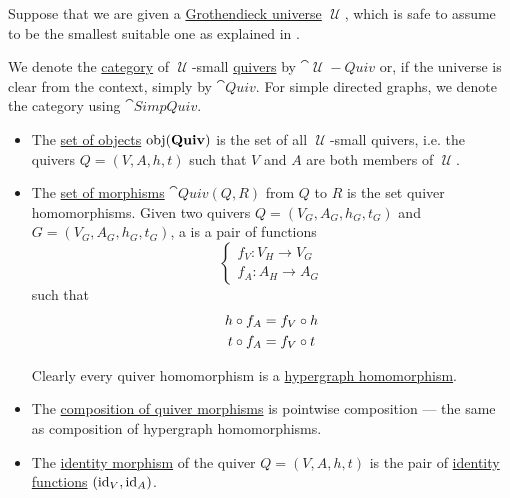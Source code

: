 \begin{definition}\label{def:category_of_small_quivers}
  Suppose that we are given a \hyperref[def:grothendieck_universe]{Grothendieck universe} \( \mscrU \), which is safe to assume to be the smallest suitable one as explained in .

  We denote the \hyperref[def:category]{category} of \( \mscrU \)-small \hyperref[def:hypergraph]{quivers} by \( \cat{\mscrU-Quiv} \) or, if the universe is clear from the context, simply by \( \cat{Quiv} \). For simple directed graphs, we denote the category using \( \cat{SimpQuiv} \).

  \begin{itemize}
    \item The \hyperref[def:category/objects]{set of objects} \( \operatorname{obj}(\operatorname{\mathbf{Quiv}}) \) is the set of all \( \mscrU \)-small quivers, i.e. the quivers \( Q = (V, A, h, t) \) such that \( V \) and \( A \) are both members of \( \mscrU \).

    \item The \hyperref[def:category/morphisms]{set of morphisms} \( \cat{Quiv}(Q, R) \) from \( Q \) to \( R \) is the set quiver homomorphisms. Given two quivers \( Q = (V_G, A_G, h_G, t_G) \) and \( G = (V_G, A_G, h_G, t_G) \), a  is a pair of functions
    \begin{equation}\label{eq:def:category_of_small_quivers/homomorphism}
      \begin{cases}
        f_V: V_H \to V_G \\
        f_A: A_H \to A_G
      \end{cases}
    \end{equation}
    such that
    \begin{align}
      h \mathbin \circ f_A &= f_V \mathbin \circ h \label{eq:def:category_of_small_quivers/homomorphism/head} \\
      t \mathbin \circ f_A &= f_V \mathbin \circ t \label{eq:def:category_of_small_quivers/homomorphism/tail}
    \end{align}

    Clearly every quiver homomorphism is a \hyperref[eq:def:category_of_small_hypergraphs/homomorphism]{hypergraph homomorphism}.

    \item The \hyperref[def:category/composition]{composition of quiver morphisms} is pointwise composition --- the same as composition of hypergraph homomorphisms.

    \item The \hyperref[def:category/identity]{identity morphism} of the quiver \( Q = (V, A, h, t) \) is the pair of \hyperref[def:multi_valued_function/identity]{identity functions} \( (\operatorname{id}_V, \operatorname{id}_A) \).
  \end{itemize}
\end{definition}

